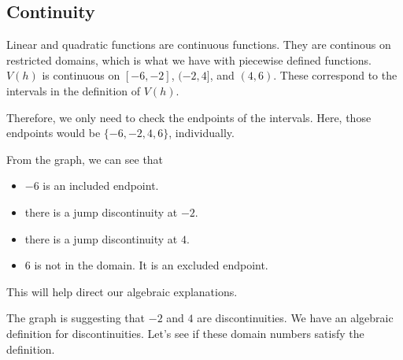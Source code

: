 \documentclass{ximera}
\begin{document}
\subsection*{Continuity} 


Linear and quadratic functions are continuous functions. They are continous on restricted domains, which is what we have with piecewise defined functions.  $V(h)$ is continuous on $[-6, -2]$, $(-2, 4]$, and $(4, 6)$.  These correspond to the intervals in the definition of $V(h)$. 

Therefore, we only need to check the endpoints of the intervals.  Here, those endpoints would be $\{ -6, -2, 4, 6 \}$, individually.



\begin{observation} 
From the graph, we can see that 

\begin{itemize}
\item $-6$ is an included endpoint.  
\item there is a jump discontinuity at $-2$.
\item there is a jump discontinuity at $4$.
\item $6$ is not in the domain. It is an excluded endpoint.
\end{itemize}



\end{observation}


This will help direct our algebraic explanations. 


The graph is suggesting that $-2$ and $4$ are discontinuities.  We have an algebraic definition for discontinuities.  Let's see if these domain numbers satisfy the definition. 
\end{document}
